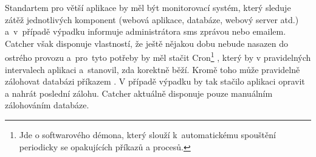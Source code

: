 Standartem pro větší aplikace by měl být monitorovací systém,
který sleduje zátěž jednotlivých komponent (webová aplikace, databáze, webový server atd.)
a~v~případě výpadku informuje administrátora sms zprávou nebo emailem.
Catcher však disponuje vlastností, že ještě nějakou dobu nebude nasazen do ostrého provozu
a~pro~tyto potřeby by měl stačit Cron\footnote{Jde o softwarového démona, který slouží
k~automatickému spouštění periodicky se opakujících příkazů a procesů.}
, který by v pravidelných intervalech  aplikaci a~stanovil, zda korektně běží.
Kromě toho může pravidelně zálohovat databázi příkazem \cite{mysqldump}.
V případě výpadku by tak stačilo aplikaci opravit a nahrát poslední zálohu.
Catcher aktuálně disponuje pouze manuálním zálohováním databáze.





